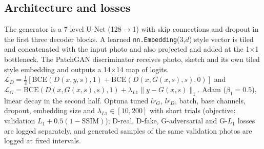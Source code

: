 \documentclass[conference]{IEEEtran}
\begin{document}
\subsection{Architecture and losses}
The generator is a 7-level U-Net (128$\rightarrow$1) with skip connections and dropout in the first three decoder blocks. A learned \texttt{nn.Embedding}(3,$d$) style vector is tiled and concatenated with the input photo and also projected and added at the 1$\times$1 bottleneck. The PatchGAN discriminator receives photo, sketch and its own tiled style embedding and outputs a 14$\times$14 map of logits. $\mathcal{L}_D=\tfrac12[\mathrm{BCE}(D(x,y,s),1)+\mathrm{BCE}(D(x,G(x,s),s),0)]$ and $\mathcal{L}_G=\mathrm{BCE}(D(x,G(x,s),s),1)+\lambda_{L1}\|y-G(x,s)\|_1$. Adam ($\beta_1=0.5$), linear decay in the second half. Optuna tuned $lr_G$, $lr_D$, batch, base channels, dropout, embedding size and $\lambda_{L1}\in[10,200]$ with short trials (objective: validation $L_1+0.5(1-\mathrm{SSIM})$); D-real, D-fake, G-adversarial and G-$L_1$ losses are logged separately, and generated samples of the same validation photos are logged at fixed intervals.
\end{document}
